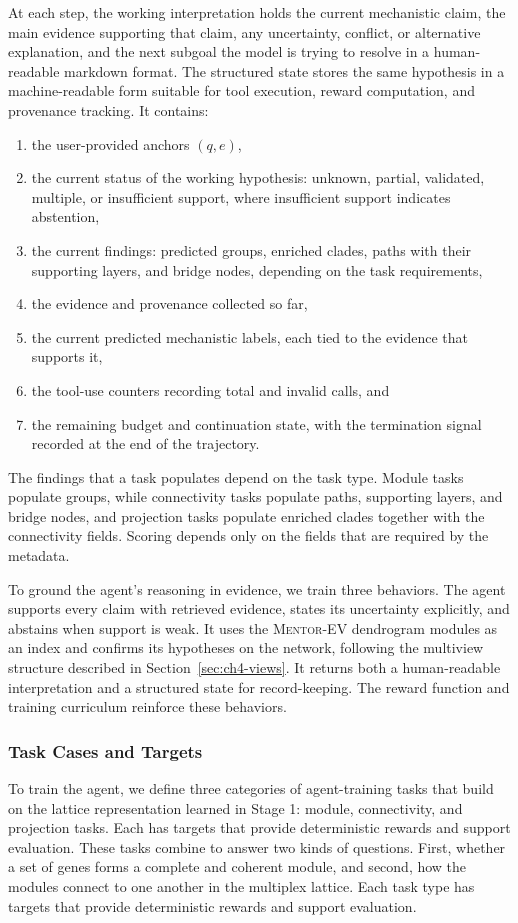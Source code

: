 At each step, the working interpretation holds the current mechanistic claim, the main evidence supporting that claim, any uncertainty, conflict, or alternative explanation, and the next subgoal the model is trying to resolve in a human-readable markdown format. The structured state stores the same hypothesis in a machine-readable form suitable for tool execution, reward computation, and provenance tracking. It contains:
\begin{enumerate}
    \item the user-provided anchors $(q, e)$,
    \item the current status of the working hypothesis: unknown, partial, validated, multiple, or insufficient support, where insufficient support indicates abstention,
    \item the current findings: predicted groups, enriched clades, paths with their supporting layers, and bridge nodes, depending on the task requirements,
    \item the evidence and provenance collected so far,
    \item the current predicted mechanistic labels, each tied to the evidence that supports it,
    \item the tool-use counters recording total and invalid calls, and
    \item the remaining budget and continuation state, with the termination signal recorded at the end of the trajectory.
\end{enumerate}

The findings that a task populates depend on the task type. Module tasks populate groups, while connectivity tasks populate paths, supporting layers, and bridge nodes, and projection tasks populate enriched clades together with the connectivity fields. Scoring depends only on the fields that are required by the metadata.

To ground the agent's reasoning in evidence, we train three behaviors. The agent supports every claim with retrieved evidence, states its uncertainty explicitly, and abstains when support is weak. It uses the \textsc{Mentor-EV} dendrogram modules as an index and confirms its hypotheses on the network, following the multiview structure described in Section~\ref{sec:ch4-views}. It returns both a human-readable interpretation and a structured state for record-keeping. The reward function and training curriculum reinforce these behaviors.

\subsubsection{Task Cases and Targets}\label{sec:ch4-task-cases}
To train the agent, we define three categories of agent-training tasks that build on the lattice representation learned in Stage 1: module, connectivity, and projection tasks. Each has targets that provide deterministic rewards and support evaluation. These tasks combine to answer two kinds of questions. First, whether a set of genes forms a complete and coherent module, and second, how the modules connect to one another in the multiplex lattice. Each task type has targets that provide deterministic rewards and support evaluation.

